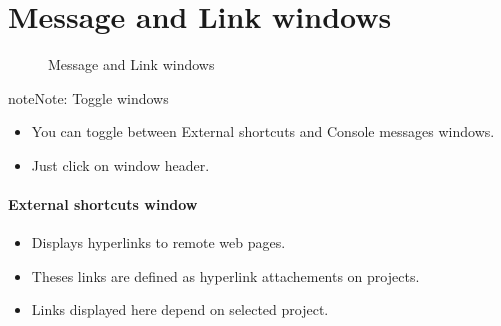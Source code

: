 \documentclass[letterpaper,10pt,english]{sphinxmanual}
\begin{document}
\section{Message and Link windows}
\label{Gui:message-and-link-windows}\begin{figure}[htbp]
\centering
\capstart

\caption{Message and Link windows}\end{figure}

\begin{notice}{note}{Note:}
Toggle windows
\begin{itemize}
\item {} 
You can toggle between External shortcuts and Console messages windows.

\item {} 
Just click on window header.

\end{itemize}
\end{notice}
\paragraph{External shortcuts window}
\begin{itemize}
\item {} 
Displays hyperlinks to remote web pages.

\item {} 
Theses links are defined as hyperlink attachements on projects.

\item {} 
Links displayed here depend on selected project.

\end{itemize}
\begin{figure}[htbp]
\centering

\end{figure}
\end{document}
